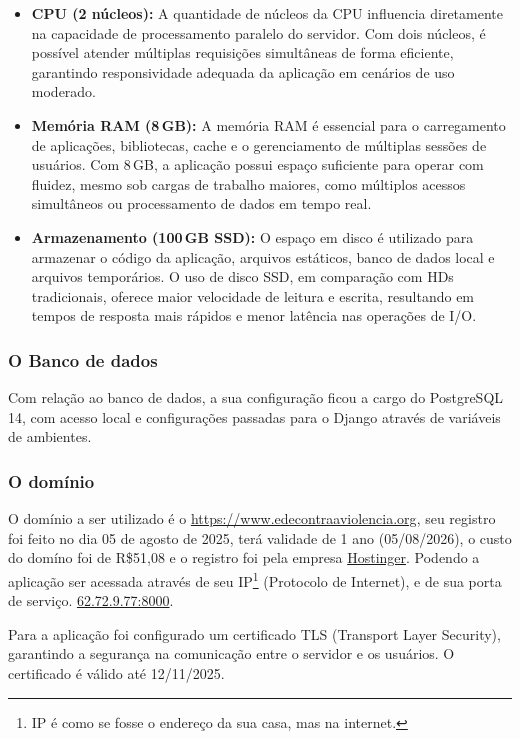 \begin{itemize}
    \item \textbf{CPU (2 núcleos):} A quantidade de núcleos da CPU influencia diretamente na capacidade de processamento paralelo do servidor. Com dois núcleos, é possível atender múltiplas requisições simultâneas de forma eficiente, garantindo responsividade adequada da aplicação em cenários de uso moderado.

    \item \textbf{Memória RAM (8\,GB):} A memória RAM é essencial para o carregamento de aplicações, bibliotecas, cache e o gerenciamento de múltiplas sessões de usuários. Com 8\,GB, a aplicação possui espaço suficiente para operar com fluidez, mesmo sob cargas de trabalho maiores, como múltiplos acessos simultâneos ou processamento de dados em tempo real.

    \item \textbf{Armazenamento (100\,GB SSD):} O espaço em disco é utilizado para armazenar o código da aplicação, arquivos estáticos, banco de dados local e arquivos temporários. O uso de disco SSD, em comparação com HDs tradicionais, oferece maior velocidade de leitura e escrita, resultando em tempos de resposta mais rápidos e menor latência nas operações de I/O.
\end{itemize}


\subsubsection{O Banco de dados}
\par Com relação ao banco de dados, a sua configuração ficou a cargo do PostgreSQL 14, com acesso local e configurações passadas para o Django através de variáveis de ambientes.

\subsubsection{O domínio}
\par O domínio a ser utilizado é o \href{https://www.redecontraaviolencia.org}{https://www.edecontraaviolencia.org}, seu registro foi feito no dia 05 de agosto de 2025, terá validade de 1 ano (05/08/2026), o custo do domíno foi de R\$51,08 e o registro foi pela empresa \href{https://www.hostinger.com/br}{Hostinger}. Podendo a aplicação ser acessada através de seu IP\footnote{IP é como se fosse o endereço da sua casa, mas na internet.} (Protocolo de Internet), e de sua porta de serviço. \href{62.72.9.77:8000}{62.72.9.77:8000}.
\par Para a aplicação foi configurado um certificado TLS (Transport Layer Security), garantindo a segurança na comunicação entre o servidor e os usuários. O certificado é válido até 12/11/2025.


